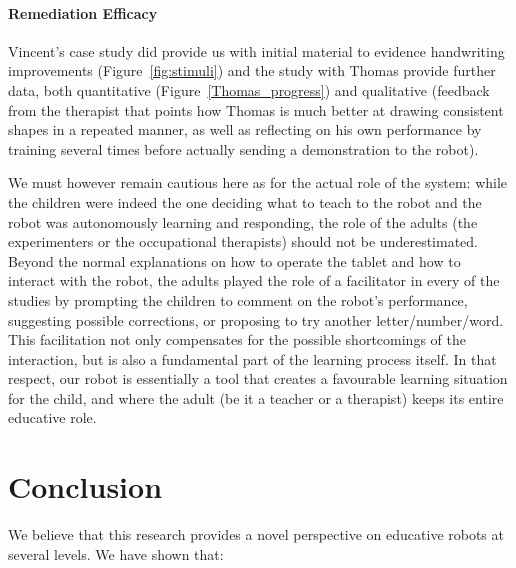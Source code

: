\documentclass{article}
\begin{document}
\paragraph{Remediation Efficacy} Vincent's case study did provide us with
initial material to evidence handwriting improvements (Figure~\ref{fig:stimuli})
and the study with Thomas provide further data, both quantitative
(Figure~\ref{Thomas_progress}) and qualitative (feedback from the therapist that
points how Thomas is much better at drawing consistent shapes in a repeated manner,
as well as reflecting on his own performance by training several times before
actually sending a demonstration to the robot).

We must however remain cautious here as for the actual role of the system: while
the children were indeed the one deciding what to teach to the robot and the
robot was autonomously learning and responding, the role of the adults (the
experimenters or the occupational therapists) should not be underestimated.
Beyond the normal explanations on how to operate the tablet and how to interact
with the robot, the adults played the role of a facilitator in every of the
studies by prompting the children to comment on the robot's performance,
suggesting possible corrections, or proposing to try another letter/number/word.
This facilitation not only compensates for the possible shortcomings of the interaction,
but is also a fundamental part of the learning process itself. In that respect,
our robot is essentially a tool that creates a favourable learning situation for
the child, and where the adult (be it a teacher or a therapist) keeps its entire
educative role.

\section{Conclusion}

We believe that this research provides a novel perspective on educative robots
at several levels. We have shown that:
\end{document}
